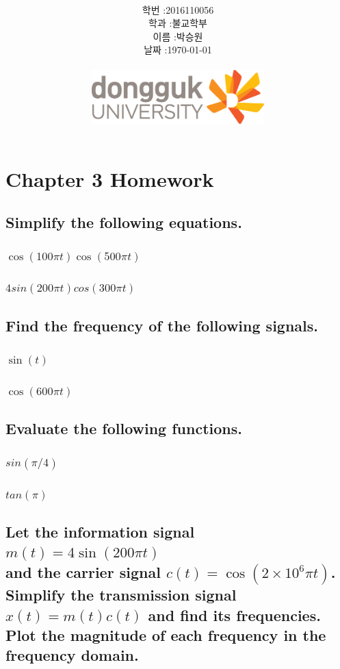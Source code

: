 \documentclass[12pt,a4paper]{article}
\title{
	\centering
	\pgfornament[width=12cm,color=teal]{84}\\
	\vspace{1cm}
	\fontsize{50}{50} \selectfont {정보통신 수학 및 실습\\Homework}\\
		\pgfornament[width=12cm,color=teal]{88}\\
	\vfill}
\author{
	\LARGE
	\begin{tabular}{rl}
		\hline
		학번 : & 2016110056\\ 
		학과 : & 불교학부 \\
		이름 : & 박승원\\
		날짜 : & \today\\
		\hline
	\end{tabular}\vspace{2cm}
	\\
\includegraphics[width=0.5\textwidth]{logo.jpg}
	}
\date{}
\begin{document}
\maketitle
{}
\noindent
\lstset{language=matlab, columns=flexible, tabsize=4, frame=shadowbox, showstringspaces=false, breaklines=true, upquote=true, basicstyle=\normalsize}

\renewcommand{\thesubsubsection}{\alph{subsubsection})}
\renewcommand{\thesubsection}{\arabic{subsection}.}
\newpage
\section*{Chapter 3 Homework}

\subsection{Simplify the following equations.}

\subsubsection{$\cos(100\pi t)\cos(500\pi t)$} 
\subsubsection{$4sin(200\pi t)cos(300\pi t)$} 

\subsection{Find the frequency of the following signals.} 
\subsubsection{$\sin(t)$} 
\subsubsection{$\cos(600\pi t)$} 

\subsection{Evaluate the following functions.} 
\subsubsection{$sin(\pi /4)$} 
\subsubsection{$tan(\pi )$} 

\subsection{Let the information signal $m(t)=4\sin (200\pi t)$ \\
	and the carrier signal $c(t)=\cos(2\times 10^6\pi t)$.\\
Simplify the transmission signal $x(t)=m(t)c(t)$ and	find its frequencies. \\
 Plot the magnitude of each frequency in the	frequency domain.} 
\end{document}
